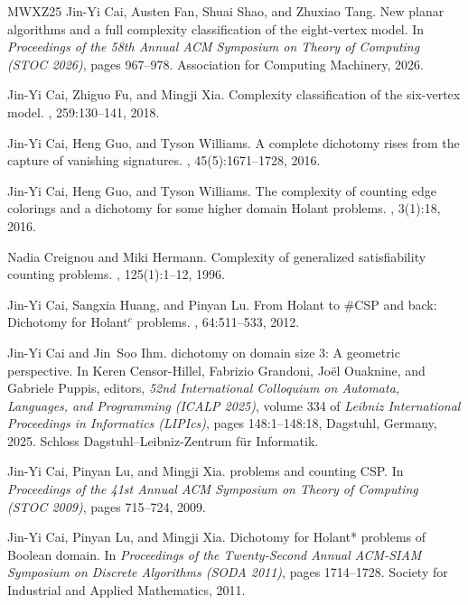 \documentclass[11pt,letterpaper,onecolumn]{article}
\theoremstyle{plain}
\theoremstyle{definition}
\theoremstyle{remark}
\begin{document}
\begin{thebibliography}{MWXZ25}
Jin-Yi Cai, Austen Fan, Shuai Shao, and Zhuxiao Tang.
\newblock New planar algorithms and a full complexity classification of the
  eight-vertex model.
\newblock In {\em Proceedings of the 58th Annual ACM Symposium on Theory of
  Computing (STOC 2026)}, pages 967--978. Association for Computing Machinery,
  2026.

Jin-Yi Cai, Zhiguo Fu, and Mingji Xia.
\newblock Complexity classification of the six-vertex model.
, 259:130--141, 2018.

Jin-Yi Cai, Heng Guo, and Tyson Williams.
\newblock A complete dichotomy rises from the capture of vanishing signatures.
, 45(5):1671--1728, 2016.

Jin-Yi Cai, Heng Guo, and Tyson Williams.
\newblock The complexity of counting edge colorings and a dichotomy for some
  higher domain {Holant} problems.
, 3(1):18, 2016.

Nadia Creignou and Miki Hermann.
\newblock Complexity of generalized satisfiability counting problems.
, 125(1):1--12, 1996.

Jin-Yi Cai, Sangxia Huang, and Pinyan Lu.
\newblock From {Holant} to {{\#CSP}} and back: Dichotomy for {Holant}$^c$
  problems.
, 64:511--533, 2012.

Jin-Yi Cai and Jin~Soo Ihm.
 dichotomy on domain size 3: A geometric perspective.
\newblock In Keren Censor-Hillel, Fabrizio Grandoni, Jo{\"e}l Ouaknine, and
  Gabriele Puppis, editors, {\em 52nd International Colloquium on Automata,
  Languages, and Programming (ICALP 2025)}, volume 334 of {\em Leibniz
  International Proceedings in Informatics (LIPIcs)}, pages 148:1--148:18,
  Dagstuhl, Germany, 2025. Schloss Dagstuhl--Leibniz-Zentrum f{\"u}r
  Informatik.

Jin-Yi Cai, Pinyan Lu, and Mingji Xia.
 problems and counting {CSP}.
\newblock In {\em Proceedings of the 41st Annual ACM Symposium on Theory of
  Computing (STOC 2009)}, pages 715--724, 2009.

Jin-Yi Cai, Pinyan Lu, and Mingji Xia.
\newblock Dichotomy for {Holant*} problems of {Boolean} domain.
\newblock In {\em Proceedings of the Twenty-Second Annual ACM-SIAM Symposium on
  Discrete Algorithms (SODA 2011)}, pages 1714--1728. Society for Industrial
  and Applied Mathematics, 2011.


\end{thebibliography}
\end{document}
